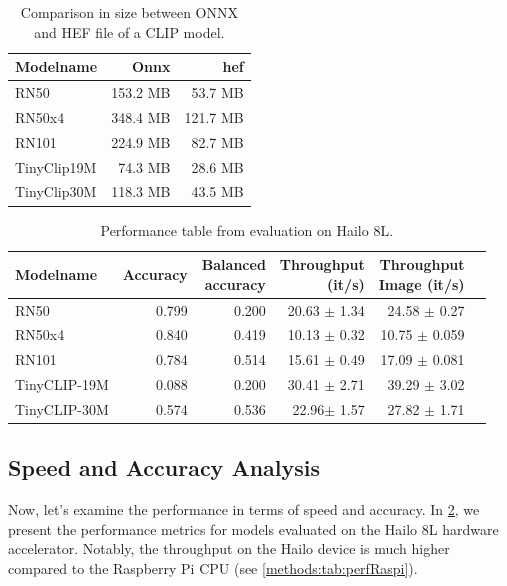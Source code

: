 \begin{table}
    \centering
    \begin{tabular}{l|rr}
    \hline
    Modelname & Onnx & \acrshort{hef}\\\hline
    RN50 & 153.2 MB & 53.7 MB \\ 
    RN50x4 & 348.4 MB & 121.7 MB  \\ 
    RN101 & 224.9 MB  & 82.7 MB \\
    TinyClip19M & 74.3 MB & 28.6 MB  \\ 
    TinyClip30M & 118.3 MB & 43.5 MB  \\ 
    \end{tabular}
    \caption{Comparison in size between ONNX and HEF file of a CLIP model.}
    \label{methods:tab:sizecompare}
\end{table}

\begin{table}[]
    \centering
    \begin{tabular}{l|rrrrr}
    \hline
    Modelname & Accuracy &  \makecell{Balanced \\accuracy}&\makecell{Throughput\\(it/s)} & \makecell{Throughput \\ Image (it/s)} & \\ \hline
    RN50 & 0.799 & 0.200 & 20.63 $\pm$ 1.34 & 24.58 $\pm$ 0.27  \\ 
    RN50x4 & 0.840 & 0.419 & 10.13 $\pm$ 0.32 & 10.75  $\pm$ 0.059\\
    RN101 & 0.784& 0.514 & 15.61 $\pm$ 0.49 & 17.09 $\pm$ 0.081\\  
    TinyCLIP-19M & 0.088 & 0.200 & 30.41 $\pm$ 2.71 & 39.29 $\pm$ 3.02 \\ 
    TinyCLIP-30M & 0.574 & 0.536 & 22.96$\pm$ 1.57 & 27.82 $\pm$ 1.71\\ 
    \end{tabular}
    \caption{Performance table from evaluation on Hailo 8L.}
    \label{methods:tab:perfHailo}
\end{table}

\subsection{Speed and Accuracy Analysis}

Now, let's examine the performance in terms of speed and accuracy.
In \cref{methods:tab:perfHailo}, we present the performance metrics for models evaluated on the Hailo 8L hardware accelerator.
Notably, the throughput on the Hailo device is much higher compared to the Raspberry Pi CPU (see \cref{methods:tab:perfRaspi}).

